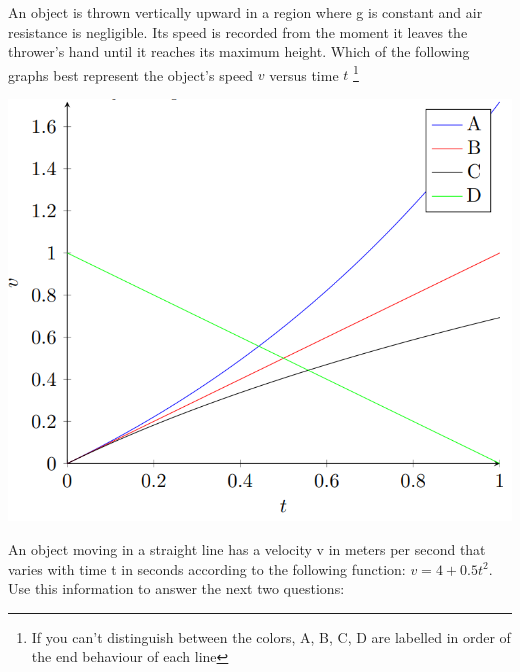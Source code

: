 
\begin{question}
An object is thrown vertically upward in a region where g is constant and air resistance is negligible. Its speed is recorded from the moment it leaves the thrower's hand until it reaches its maximum height. Which of the following graphs best represent the object's speed $v$ versus time $t$ \footnote{If you can't distinguish between the colors, A, B, C, D are labelled in order of the end behaviour of each line}







\includegraphics{Figures/Figure14}

\end{question}
\newpage
An object moving in a straight line has a velocity v in meters per second that varies with time t in seconds according to the following function: $v=4+0.5t^2$. Use this information to answer the next two questions:

